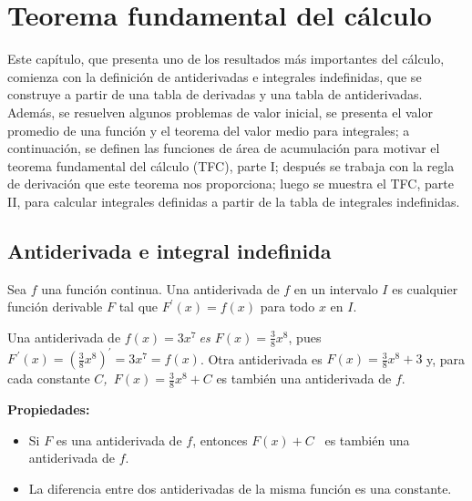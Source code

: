 \chapter{Teorema fundamental del cálculo}\label{antiderivada}

Este capítulo, que presenta uno de los resultados más importantes del cálculo, comienza con la definición de antiderivadas e integrales indefinidas, que se construye a partir de una tabla de derivadas y una tabla de antiderivadas. Además, se resuelven algunos problemas de valor inicial, se presenta el valor promedio de una función y el teorema del valor medio para integrales; a continuación, se definen las funciones de área de acumulación para motivar el teorema fundamental del cálculo (TFC), parte I; después se trabaja con la regla de derivación que este teorema nos proporciona; luego se muestra el TFC, parte II, para calcular integrales definidas a partir de la tabla de integrales indefinidas. %

\section{Antiderivada e integral indefinida}

Sea $f$ una función continua. Una antiderivada de $f$ en un intervalo $I$ es cualquier función derivable $F$ tal que $F^\prime(x)=f(x)$ para todo $x$ en $I$.

\begin{ejemplo}
\textnormal{Una antiderivada de \textit{$f(x)=3x^{7}\ $es $F(x)=\frac{3}{8}x^{8}$}, pues \textit{$F^{\,\prime}(x)=\left(\frac{3}{8}x^{8}\right)^{\prime}=3x^{7}=f(x)$}. Otra antiderivada es \textit{$F(x)=\frac{3}{8}x^{8}+3$} y, para cada constante \textit{$C$,\ $F(x)=\frac{3}{8}x^{8}+C$} es también una antiderivada de \textit{$f.$}}
\end{ejemplo}

\textbf{Propiedades:}\label{PropAntider}
\begin{itemize}[leftmargin=1.2em, itemindent=0pt,     labelwidth=,labelsep=0.5em,]


\item Si $F$ es una antiderivada de $f$, entonces $F\left( x\right) +C$ \ es también una antiderivada de $f$.

\item La diferencia entre dos antiderivadas de la misma función es una constante.

\end{itemize}

